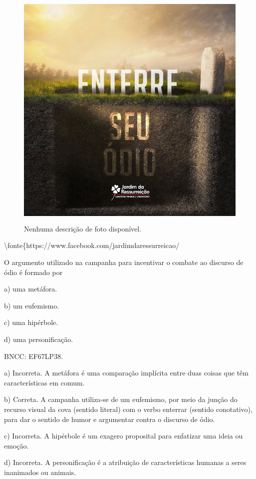 {\begin{figure}
\centering
\includegraphics[width=4.65833in,height=4.65833in]{./imgSAEB_6_POR/media/image35.jpeg}
\caption{Nenhuma descrição de foto disponível.}
\end{figure}

\textbackslash fonte\{https://www.facebook.com/jardimdaressurreicao/

O argumento utilizado na campanha para incentivar o combate ao discurso
de ódio é formado por

a) uma metáfora.

b) um eufemismo.

c) uma hipérbole.

d) uma personificação.

BNCC: EF67LP38.

a) Incorreta. A metáfora é uma comparação implícita entre duas coisas
que têm características em comum.

b) Correta. A campanha utiliza-se de um eufemismo, por meio da junção do
recurso visual da cova (sentido literal) com o verbo enterrar (sentido
conotativo), para dar o sentido de humor e argumentar contra o discurso
de ódio.

c) Incorreta. A hipérbole é um exagero proposital para enfatizar uma
ideia ou emoção.

d) Incorreta. A personificação é a atribuição de características humanas
a seres inanimados ou animais.

}
